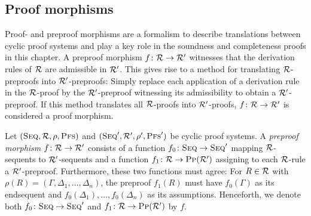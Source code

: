 \subsection{Proof morphisms}
\label{sec:homs}

Proof- and preproof morphisms are a formalism to describe translations between
cyclic proof systems and play a key role in the soundness and completeness
proofs in this chapter.
A preproof morphism $f \colon \mathcal{R} \to \mathcal{R}'$ witnesses that the
derivation rules of $\mathcal{R}$ are admissible in $\mathcal{R}'$. This gives rise to a method for
translating $\mathcal{R}$-preproofs into $\mathcal{R}'$-preproofs: Simply replace each application of
a derivation rule in the $\mathcal{R}$-proof by the $\mathcal{R}'$-preproof witnessing its
admissibility to obtain a $\mathcal{R}'$-preproof. If this method translates all
$\mathcal{R}$-proofs into $\mathcal{R}'$-proofs, $f \colon \mathcal{R} \to \mathcal{R}'$ is considered a
proof morphism.

\begin{definition}
  Let $(\textsc{Seq}, \mathcal{R}, \rho, \textsc{Pfs})$ and $(\textsc{Seq}', \mathcal{R}', \rho', \textsc{Pfs}')$ be cyclic proof
  systems. A \emph{preproof morphism} $f \colon \mathcal{R} \to \mathcal{R}'$ consists of a
  function $f_0 \colon \textsc{Seq} \to \textsc{Seq}'$ mapping $\mathcal{R}$-sequents to $\mathcal{R}'$-sequents and
  a function $f_1 \colon \mathcal{R} \to \textsc{Pp}(\mathcal{R}')$ assigning to each $\mathcal{R}$-rule a
  $\mathcal{R}'$-preproof. Furthermore, these two functions must agree: For $R \in
  \mathcal{R}$ with $\rho(R) = (\Gamma, \Delta_1, \ldots, \Delta_n)$, the preproof
  $f_1(R)$ must have $f_0(\Gamma)$ as its endsequent and $f_0(\Delta_1),
  \ldots, f_0(\Delta_n)$ as its assumptions. Henceforth, we denote both $f_0 \colon
  \textsc{Seq} \to \textsc{Seq}'$ and $f_1 \colon \mathcal{R} \to \textsc{Pp}(\mathcal{R}')$ by $f$.
\end{definition}

